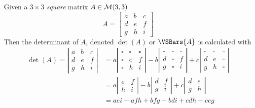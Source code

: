 \begin{definition}
    Given a $3 \times 3$ \textit{square} matrix $A \in \mathcal{M}(3, 3)$
    \begin{equation}
        A = \begin{bmatrix}
            a & b & c \\
            d & e & f \\
            g & h & i
        \end{bmatrix}
    \end{equation}
    Then the determinant of $A$, denoted $\det(A)$ or $\VSBars{A}$ is calculated with
    \begin{align}
        \det(A) = 
        \left\vert
        \begin{matrix}
            a & b & c \\
            d & e & f \\
            g & h & i
        \end{matrix}
        \right\vert
        &=
        a
        \left\vert
        \begin{matrix}
            \square & \square & \square \\
            \square & e       & f       \\
            \square & h       & i
        \end{matrix}
        \right\vert
        - b
        \left\vert
        \begin{matrix}
            \square & \square & \square \\
            d       & \square & f       \\
            g       & \square & i
        \end{matrix}
        \right\vert
        + c
        \left\vert
        \begin{matrix}
            \square & \square & \square \\
            d       & e       & \square \\
            g       & h       & \square
        \end{matrix} 
        \right\vert \\
        &=
        a
        \left\vert
        \begin{matrix}
            e & f \\
            h & i
        \end{matrix}        
        \right\vert
        - b
        \left\vert
        \begin{matrix}
            d & f \\
            g & i
        \end{matrix}        
        \right\vert
        + c
        \left\vert
        \begin{matrix}
            d & e \\
            g & h
        \end{matrix}        
        \right\vert \\
        &=
        aei - afh + bfg - bdi + cdh - ceg 
    \end{align}
\end{definition}

